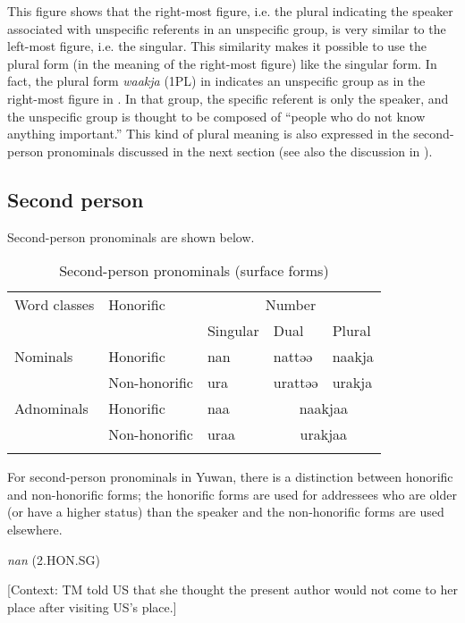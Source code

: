 This figure shows that the right-most figure, i.e. the plural indicating the speaker associated with unspecific referents in an unspecific group, is very similar to the left-most figure, i.e. the singular. This similarity makes it possible to use the plural form (in the meaning of the right-most figure) like the singular form. In fact, the plural form \textit{waakja} (1PL) in  indicates an unspecific group as in the right-most figure in . In that group, the specific referent is only the speaker, and the unspecific group is thought to be composed of “people who do not know anything important.” This kind of plural meaning is also expressed in the second-person pronominals discussed in the next section (see also the discussion in ).

\subsection{Second person}

Second-person pronominals are shown below.

\begin{table}
\caption{\label{tab:key:34}Second-person pronominals (surface forms)}
\begin{tabular}{lllll}
\lsptoprule
Word classes  & Honorific & \multicolumn{3}{c}{Number}\\\cmidrule(lr){3-5}
              &           &    Singular & Dual & Plural\\\midrule
Nominals & Honorific & nan & nattəə & naakja\\
         & Non-honorific & ura & urattəə & urakja\\
Adnominals & Honorific & naa & \multicolumn{2}{c}{naakjaa}\\
           & Non-honorific & uraa & \multicolumn{2}{c}{urakjaa}\\
\lspbottomrule
\end{tabular}
\end{table}

For second-person pronominals in Yuwan, there is a distinction between honorific and non-honorific forms; the honorific forms are used for addressees who are older (or have a higher status) than the speaker and the non-honorific forms are used elsewhere.

\ea \label{ex:5:9}  \ea \label{ex:5:9a} \textit{nan} (2.HON.SG)

    [Context: TM told US that she thought the present author would not come to her place after visiting US’s place.]

